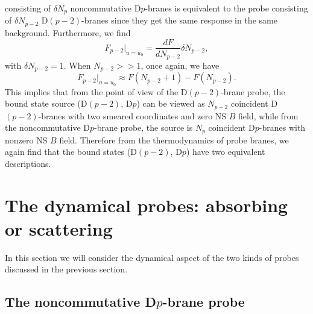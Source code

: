 \documentclass[a4paper,12pt]{article}
\newcommand{\sect}[1]{\setcounter{equation}{0}\section{#1}}
\begin{document}
consisting of $\delta N_p$ noncommutative D$p$-branes is equivalent to the
probe consisting of $\delta N_{p-2}$ D$(p-2)$-branes since they get the same
response in the same background. Furthermore, we find
\begin{equation}
F_{p-2}|_{u=u_0}=\frac{dF}{dN_{p-2}}\delta N_{p-2},
\end{equation}
with $\delta N_{p-2}=1$. When $N_{p-2}>>1$, once again, we have
\begin{equation}
F_{p-2}|_{u=u_0}\approx F(N_{p-2}+1)-F(N_{p-2}).
\end{equation}
This implies that from the point of view of the D$(p-2)$-brane probe,
the bound state source (D$(p-2)$, D$p$) can be viewed as
$N_{p-2}$ coincident D$(p-2)$-branes with two smeared coordinates and zero
NS $B$ field, while from the noncommutative D$p$-brane probe, the
source is $N_p$ coincident D$p$-branes with nonzero NS $B$ field. Therefore
from the thermodynamics of probe branes, we again find that the
bound states (D$(p-2)$, D$p$) have two equivalent descriptions.


\sect{The dynamical probes: absorbing or scattering}

In this section we will consider the dynamical aspect of the two kinds of
probes discussed in the previous section.


\subsection{The noncommutative D$p$-brane probe}
\end{document}
